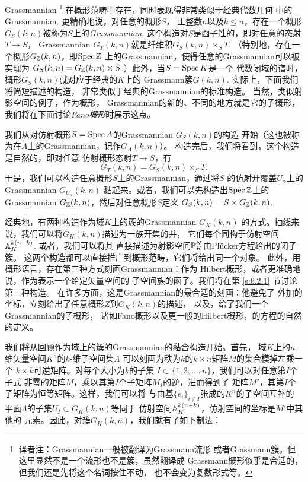 Grassmannian%
\footnote{译者注：Grassmannian一般被翻译为Grassmann流形
或者Grassmann簇，但这里显然不是一个流形也不是簇，虽然翻译成
Grassmann概形似乎是合适的，但我们还是先将这个名词按住不动，
也不会变为复数形式等。}%
在概形范畴中存在，同时表现得非常类似于经典代数几何
中的Grassmannian. 更精确地说，对任意的概形$S$，
正整数$n$以及$k\leq n$，存在一个概形
$G_S(k,n)$被称为$S$上的\textit{Grassmannian}. 
这个构造对$S$是函子性的，即对任意的态射$T\to S$，
Grassmannian $G_T(k,n)$就是纤维积$G_S(k,n)\times_S T$. 
（特别地，存在一个概形$G_\zz(k,n)$，即$\spec \zz$
上的Grassmannian，使得任意的Grassmannian可以被实现为
$G_S(k,n)=G_\zz(k,n)\times S$.）此外，当$S=\spec K$是一个
代数闭域的谱时，概形$G_S(k,n)$就对应于经典的$K$上的
Grassmann簇$G(k,n)$. 实际上，下面我们将简短描述的构造，
非常类似于经典的Grassmannian的标准构造。%
当然，类似射影空间的例子，作为概形，
Grassmannian的新的、不同的地方就是它的子概形，
我们将在下面讨论\textit{Fano概形}时展示这点。

我们从对仿射概形$S=\spec A$的Grassmannian $G_S(k,n)$的构造
开始（这也被称为在$A$上的Grassmannian，记作$G_A(k,n)$）。
构造完后，我们将看到，这个构造是自然的，即对任意
仿射概形态射$T\to S$，有
\[
	G_T(k,n)=G_S(k,n)\times_S T.
\]
于是，我们可以构造任意概形$S$上的Grassmannian，通过将$S$
的仿射开覆盖$U_\alpha$上的Grassmannian $G_{U_\alpha}(k,n)$
黏起来。或者，我们可以先构造出$\spec\zz$上的Grassmannian
$G_{\zz}(k,n)$，然后对任意概形$S$定义
$G_S(k,n)=S\times G_\zz(k,n)$.

经典地，有两种构造作为域$K$上的簇的Grassmannian $G_K(k,n)$
的方式。抽线来说，我们可以将$G_K(k,n)$描述为一族开集的并，
它们每个同构于仿射空间$\A^{k(n-k)}_K$. 或者，我们可以将其
直接描述为射影空间$\P^N_K$由Pl\"{u}cker方程给出的闭子簇。
这两个构造都可以直接推广到概形范畴，它们将给出同一个对象。
此外，用概形语言，存在第三种方式刻画Grassmannian：作为
Hilbert概形，或者更准确地说，作为表示一个给定矢量空间的
子空间族的函子。我们将在第 \ref{s:6.2.1} 节讨论第三种构造。
在许多方面，这是Grassmannian的最合适的刻画：他避免了
外加的坐标，立刻给出了任意概形$Z$到$G_K(k,n)$的描述，
以及，给了我们一个Grassmannian的子概形，
诸如Fano概形以及更一般的Hilbert概形，的方程的自然的定义。

我们将从回顾作为域上的簇的Grassmannian的黏合构造开始。首先，
域$K$上的$n$-维矢量空间$K^n$的$k$-维子空间集$\Lambda$
可以刻画为秩为$k$的$k\times n$矩阵$M$的集合模掉左乘一个
$k\times k$可逆矩阵。对每个大小为$k$的子集
$I\subset \{1,2,\dots,n\}$，我们可以对任意第$I$个子式
非零的矩阵$M$，乘以其第$I$个子矩阵$M_I$的逆，进而得到了
矩阵$M'$，其第$I$个子矩阵为恒等矩阵。这样，我们可以将
与由基$\{e_i\}_{i\not\in I}$张成的$K^n$的子空间互补的
平面$\Lambda$的子集$U_I\subset G_K(k,n)$等同于
仿射空间$\A_K^{k(n-k)}$，仿射空间的坐标是$M'$中其他的
元素。因此，对簇$G_K(k,n)$，我们就有了如下制法：

